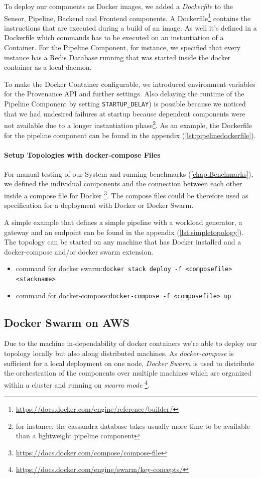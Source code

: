 To deploy our components as Docker images, we added a \emph{Dockerfile} to the Sensor, Pipeline, Backend and Frontend components. A Dockerfile\footnote{\url{https://docs.docker.com/engine/reference/builder/}} contains the instructions that are executed during a build of an image. As well it's defined in a Dockerfile which commands has to be executed on an instantiation of a Container. For the Pipeline Component, for instance, we specified that every instance has a Redis Database running that was started inside the docker container as a local daemon.

To make the Docker Container configurable, we introduced environment variables for the Provenance API and further settings. Also delaying the runtime of the Pipeline Component by setting \texttt{STARTUP\_DELAY}) is possible because we noticed that we had undesired failures at startup because dependent components were not available due to a longer instantiation phase\footnote{for instance, the cassandra database takes usually more time to be available than a lightweight pipeline component}. As an example, the Dockerfile for the pipeline component can be found in the appendix (\ref{lst:pipelinedockerfile}).

\paragraph*{Setup Topologies with docker-compose Files} 
For manual testing of our System and running benchmarks (\ref{chap:Benchmarks}), we defined the individual components and the connection between each other inside a compose file for Docker \footnote{\url{https://docs.docker.com/compose/compose-file}}. The compose files could be therefore used as specification for a deployment with Docker or Docker Swarm.

A simple example that defines a simple pipeline with a workload generator, a gateway and an endpoint can be found in the appendix (\ref{lst:simpletopology}).
The topology can be started on any machine that has Docker installed and a docker-compose and/or docker swarm extension.

\begin{itemize}
	\item command for docker swarm:\texttt{docker stack deploy -f <composefile> <stackname> }
	\item command for docker-compose:\texttt{docker-compose -f <composefile> up} 
\end{itemize}


\subsection{Docker Swarm on AWS}
Due to the machine in-dependability of docker containers we're able to deploy our topology locally but also along distributed machines.
As \emph{docker-compose} is sufficient for a local deployment on one node, \emph{Docker Swarm} is used to distribute the orchestration of the components over multiple machines which are organized within a cluster and running on \emph{swarm mode} \footnote{\url{https://docs.docker.com/engine/swarm/key-concepts/}}.

